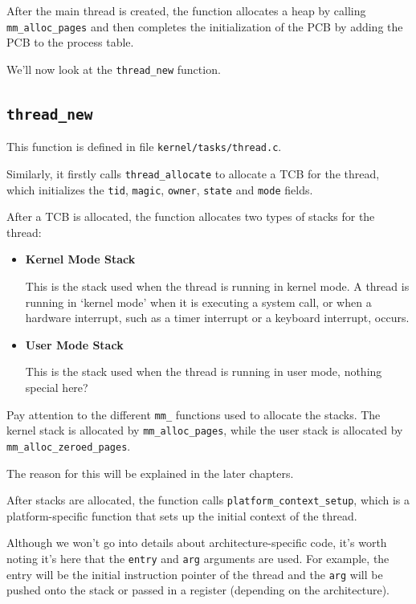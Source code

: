 After the main thread is created, the function allocates a heap by calling \texttt{mm\_alloc\_pages}
and then completes the initialization of the PCB by adding the PCB to the process table.

We'll now look at the \texttt{thread\_new} function.

\subsection{\texttt{thread\_new}}

This function is defined in file \texttt{kernel/tasks/thread.c}.

Similarly, it firstly calls \texttt{thread\_allocate} to allocate a TCB for the thread, which
initializes the \texttt{tid}, \texttt{magic}, \texttt{owner}, \texttt{state} and \texttt{mode}
fields.

After a TCB is allocated, the function allocates two types of stacks for the thread:

\begin{itemize}
    \item \textbf{Kernel Mode Stack}

          This is the stack used when the thread is running in kernel mode. A thread is running
          in `kernel mode' when it is executing a system call, or when a hardware interrupt, such as
          a timer interrupt or a keyboard interrupt, occurs.

    \item \textbf{User Mode Stack}

          This is the stack used when the thread is running in user mode, nothing special here?
\end{itemize}

\begin{tip}
    \item Pay attention to the different \texttt{mm\_} functions used to allocate the stacks.
    The kernel stack is allocated by \texttt{mm\_alloc\_pages}, while the user stack is
    allocated by \texttt{mm\_alloc\_zeroed\_pages}.
    \item The reason for this will be explained in the later chapters.
\end{tip}

After stacks are allocated, the function calls \texttt{platform\_context\_setup}, which is
a platform-specific function that sets up the initial context of the thread.

Although we won't go into details about architecture-specific code, it's worth noting it's here
that the \texttt{entry} and \texttt{arg} arguments are used. For example, the entry will be
the initial instruction pointer of the thread and the \texttt{arg} will be pushed onto the stack
or passed in a register (depending on the architecture).

